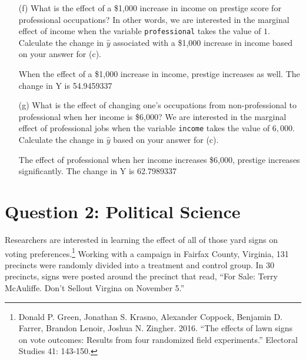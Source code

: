 \documentclass[12pt,letterpaper]{article}
\begin{document}
\begin{enumerate}
		
		\newpage
		\item [(f)]
		What is the effect of a \$1,000 increase in income on prestige score for professional occupations? In other words, we are interested in the marginal effect of income when the variable \texttt{professional} takes the value of $1$. Calculate the change in $\hat{y}$ associated with a \$1,000 increase in income based on your answer for (c).
		
		\vspace{1cm} 
		  
		
		\noindent When the effect of a \$1,000 increase in income, prestige  increases as well. The change in Y is 54.9459337 
				
		\vspace{5cm}
		
		
		\item [(g)]
		What is the effect of changing one's occupations from non-professional to professional when her income is \$6,000? We are interested in the marginal effect of professional jobs when the variable \texttt{income} takes the value of $6,000$. Calculate the change in $\hat{y}$ based on your answer for (c).
		\vspace{1cm}
		  
		
		\noindent The effect of professional when her income increases \$6,000, prestige  increases significantly. The change in Y is 62.7989337 
		
	\end{enumerate}
	
	\newpage
	
	\section*{Question 2: Political Science}
	\vspace{.25cm}
	\noindent 	Researchers are interested in learning the effect of all of those yard signs on voting preferences.\footnote{Donald P. Green, Jonathan	S. Krasno, Alexander Coppock, Benjamin D. Farrer,	Brandon Lenoir, Joshua N. Zingher. 2016. ``The effects of lawn signs on vote outcomes: Results from four randomized field experiments.'' Electoral Studies 41: 143-150. } Working with a campaign in Fairfax County, Virginia, 131 precincts were randomly divided into a treatment and control group. In 30 precincts, signs were posted around the precinct that read, ``For Sale: Terry McAuliffe. Don't Sellout Virgina on November 5.'' \\
	
\end{document}
